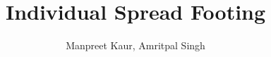 \title{Individual Spread Footing}
\author{Manpreet Kaur, Amritpal Singh}
\begin{titlepage}
     \maketitle
    \tableofcontents
\end{titlepage}
